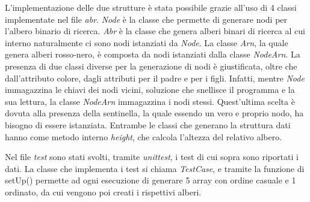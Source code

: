 \documentclass[a4paper, 11pt]{article}
\begin{document}
\vspace{0,5 cm}
L'implementazione delle due strutture è stata possibile grazie all'uso di 4 classi implementate nel file \emph{abr}. \emph{Node} è la classe che permette di generare nodi per l'albero binario di ricerca. \emph{Abr} è la classe che genera alberi binari di ricerca al cui interno naturalmente ci sono nodi istanziati da \emph{Node}. La classe \emph{Arn}, la quale genera alberi rosso-nero, è composta da nodi istanziati dalla classe \emph{NodeArn}. La presenza di due classi diverse per la generazione di nodi è giustificata, oltre che dall'attributo colore, dagli attributi per il padre e per i figli. Infatti, mentre \emph{Node} immagazzina le chiavi dei nodi vicini, soluzione che snellisce il programma e la sua lettura, la classe \emph{NodeArn} immagazzina i nodi stessi. Quest'ultima scelta è dovuta alla presenza della sentinella, la quale essendo un vero e proprio nodo, ha bisogno di essere istanziata. Entrambe le classi che generano la struttura dati hanno come metodo interno \emph{height}, che calcola l'altezza del relativo albero.

\vspace{0,5 cm}
Nel file \emph{test} sono stati svolti, tramite \emph{unittest}, i test di cui sopra sono riportati i dati. La classe che implementa i test si chiama \emph{TestCase}, e tramite la funzione di setUp() permette ad ogni esecuzione di generare 5 array con ordine casuale e 1 ordinato, da cui vengono poi creati i rispettivi alberi.
\end{document}
